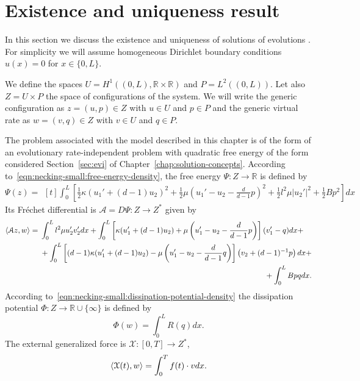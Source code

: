 \documentclass[a4paper,10pt,oneside]{amsbook}
\numberwithin{section}{chapter}
\numberwithin{equation}{chapter}
\theoremstyle{definition}
\DeclarePairedDelimiter{\dual}{\langle}{\rangle}
\begin{document}
\section{Existence and uniqueness result}

\label{sec:small-neck:existence}

In this section we discuss the existence and uniqueness of solutions of evolutions . For simplicity we will assume homogeneous Dirichlet boundary conditions $u(x)=0$ for $x\in\{0,L\}$.

We define the spaces $U=H^1((0,L),\mathbb{R}\times\mathbb{R})$ and $P=L^2((0,L))$. Let also $Z=U\times P$ the space of configurations of the system. We will write the generic configuration as $z=(u,p)\in Z$ with $u\in U$ and $p\in P$ and the generic virtual rate as $w=(v,q)\in Z$ with $v\in U$ and $q\in P$.

The problem associated with the model described in this chapter is of the form of an evolutionary rate-independent problem with quadratic free energy of the form considered Section~\ref{sec:evi} of Chapter~\ref{chap:solution-concepts}. According to~\eqref{eqn:necking-small:free-energy-density}, the free energy $\Psi\colon Z\to\mathbb{R}$ is defined by
\[
\Psi(z)=
\begin{multlined}[t]
\int_0^L\left[\frac{1}{2}\kappa(u_1'+(d-1)u_2)^2+\frac{1}{2}\mu\left(u_1'-u_2-\frac{d}{d-1}p\right)^2+\frac{1}{2}l^2\mu |u_2'|^2+\frac{1}{2}Bp^2\right]dx
\end{multlined}
\]
Its Fréchet differential is $\mathcal{A}=D\Psi\colon Z\to Z^*$ given by
\[
\dual{\mathcal{A}z,w}=
\begin{multlined}[t]
\int_0^Ll^2\mu u_2'v_2'dx+\int_0^L\left[\kappa(u_1'+(d-1)u_2)+\mu\left(u_1'-u_2-\frac{d}{d-1}p\right)\right](v_1'-q)dx+\\
+\int_0^L\left[(d-1)\kappa(u_1'+(d-1)u_2)-\mu\left(u_1'-u_2-\frac{d}{d-1}q\right)\right]\left(v_2+(d-1)^{-1}p\right)dx+\\
+\int_0^LBpqdx.
\end{multlined}
\]
According to~\eqref{eqn:necking-small:dissipation-potential-density} the dissipation potential $\Phi\colon Z\to\mathbb{R}\cup\{\infty\}$ is defined by
\[
\Phi(w)=\int_0^LR(q)dx.
\]
The external generalized force is $\mathcal{X}\colon[0,T]\to Z^*$,
\[
\dual{\mathcal{X}(t),w}=\int_0^Tf(t)\cdot vdx.
\]
\end{document}
